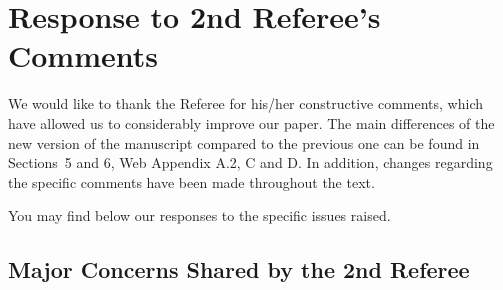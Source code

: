\section*{Response to 2nd Referee's Comments}
We would like to thank the Referee for his/her constructive comments, which have allowed us to considerably improve our paper. The main differences of the new version of the manuscript compared to the previous one can be found in Sections~5 and 6, Web Appendix A.2, C and D. In addition, changes regarding the specific comments have been made throughout the text.

You may find below our responses to the specific issues raised.

\subsection*{Major Concerns Shared by the 2nd Referee}
